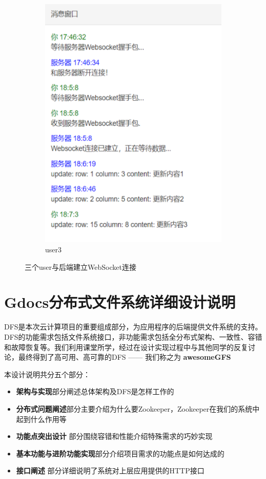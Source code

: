 \documentclass[UTF8]{ctexart}
\begin{document}
\begin{figure}[h]
\begin{subfigure}[b]{0.3\textwidth}
		\includegraphics[width=\textwidth]{be5.png}
		\caption{user3}
	\end{subfigure}
	\caption{三个user与后端建立WebSocket连接}
	\label{fig:WebSocket}
\end{figure}
\section{Gdocs分布式文件系统详细设计说明}

DFS是本次云计算项目的重要组成部分，为应用程序的后端提供文件系统的支持。DFS的功能需求包括文件系统接口，非功能需求包括全分布式架构、一致性、容错和故障恢复等。我们利用课堂所学，经过在设计实现过程中与其他同学的反复讨论，最终得到了高可用、高可靠的DFS —— 我们称之为 \textbf{awesomeGFS}
\par{本设计说明共分五个部分：}
\begin{itemize}
\item \textbf{架构与实现}部分阐述总体架构及DFS是怎样工作的
\item \textbf{分布式问题阐述}部分主要介绍为什么要Zookeeper，Zookeeper在我们的系统中起到什么作用等
\item \textbf{功能点突出设计} 部分围绕容错和性能介绍特殊需求的巧妙实现
\item \textbf{基本功能与进阶功能实现}部分介绍项目需求的功能点是如何达成的
\item \textbf{接口阐述} 部分详细说明了系统对上层应用提供的HTTP接口
\end{itemize}
\end{document}
